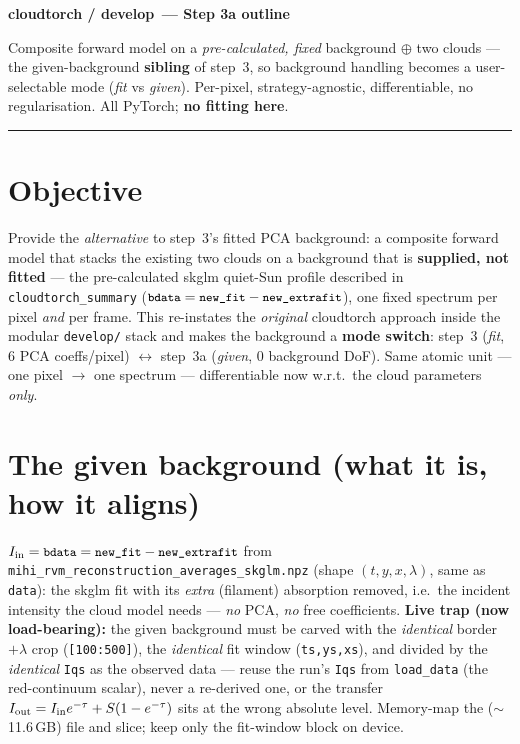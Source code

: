 \documentclass[10pt,a4paper]{article}
\newcommand{\co}[1]{{\small\texttt{#1}}}
\begin{document}
\small

{\sffamily\bfseries\large\color{acc} cloudtorch / develop\, --- Step 3a outline}

\vspace{1pt}
{\sffamily\color{gry}\footnotesize Composite forward model on a \emph{pre-calculated, fixed} background $\oplus$ two clouds --- the given-background \textbf{sibling} of step~3, so background handling becomes a user-selectable mode (\emph{fit} vs \emph{given}). Per-pixel, strategy-agnostic, differentiable, no regularisation. All PyTorch; \textbf{no fitting here}.}

\vspace{1pt}
{\footnotesize\color{gry}\rule{\textwidth}{0.4pt}}

\section{Objective}

Provide the \emph{alternative} to step~3's fitted PCA background: a composite forward model that stacks the existing two clouds on a background that is \textbf{supplied, not fitted} --- the pre-calculated skglm quiet-Sun profile described in \co{cloudtorch\_summary} ($\co{bdata}=\co{new\_fit}-\co{new\_extrafit}$), one fixed spectrum per pixel \emph{and} per frame. This re-instates the \emph{original} cloudtorch approach inside the modular \co{develop/} stack and makes the background a \textbf{mode switch}: step~3 (\emph{fit}, 6 PCA coeffs/pixel) $\leftrightarrow$ step~3a (\emph{given}, 0 background DoF). Same atomic unit --- one pixel $\rightarrow$ one spectrum --- differentiable now w.r.t.\ the cloud parameters \emph{only}.

\section{The given background (what it is, how it aligns)}

$I_{\rm in}=\co{bdata}=\co{new\_fit}-\co{new\_extrafit}$ from \co{mihi\_rvm\_reconstruction\_averages\_skglm.npz} (shape $(t,y,x,\lambda)$, same as \co{data}): the skglm fit with its \emph{extra} (filament) absorption removed, i.e.\ the incident intensity the cloud model needs --- \emph{no} PCA, \emph{no} free coefficients.
{\color{warn}\textbf{Live trap (now load-bearing):}} the given background must be carved with the \emph{identical} border$+\lambda$ crop (\co{[100:500]}), the \emph{identical} fit window (\co{ts,ys,xs}), and divided by the \emph{identical} \co{Iqs} as the observed data --- reuse the run's \co{Iqs} from \co{load\_data} (the red-continuum scalar), never a re-derived one, or the transfer $I_{\rm out}=I_{\rm in}e^{-\tau}+S(1-e^{-\tau})$ sits at the wrong absolute level. Memory-map the ($\sim$11.6\,GB) file and slice; keep only the fit-window block on device.
\end{document}
